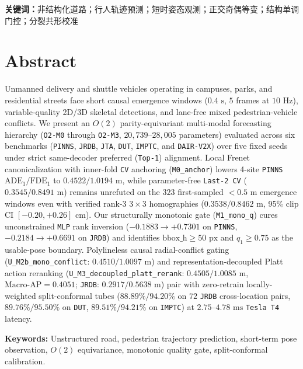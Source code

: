 \documentclass[UTF8,a4paper,12pt,openany,oneside]{ctexrep}
\begin{document}
\medskip\noindent\textbf{关键词：}非结构化道路；行人轨迹预测；短时姿态观测；正交奇偶等变；结构单调门控；分裂共形校准

\chapter*{Abstract}
Unmanned delivery and shuttle vehicles operating in campuses, parks, and residential streets face short causal emergence windows ($0.4\text{ s}$, $5$ frames at $10\text{ Hz}$), variable-quality 2D/3D skeletal detections, and lane-free mixed pedestrian-vehicle conflicts. We present an $O(2)$ parity-equivariant multi-modal forecasting hierarchy (\texttt{O2-M0} through \texttt{O2-M3}, $20{,}739\text{--}28{,}005$ parameters) evaluated across six benchmarks (\texttt{PINNS}, \texttt{JRDB}, \texttt{JTA}, \texttt{DUT}, \texttt{IMPTC}, and \texttt{DAIR-V2X}) over five fixed seeds under strict same-decoder preferred (\texttt{Top-1}) alignment. Local Frenet canonicalization with inner-fold \texttt{CV} anchoring (\texttt{M0\_anchor}) lowers 4-site \texttt{PINNS} $\text{ADE}_1/\text{FDE}_1$ to $0.4522 / 1.0194\text{ m}$, while parameter-free \texttt{Last-2 CV} ($0.3545 / 0.8491\text{ m}$) remains unrefuted on the $323$ first-sampled $<0.5\text{ m}$ emergence windows even with verified rank-3 $3\times 3$ homographies ($0.3538 / 0.8462\text{ m}$, 95\% clip CI $[-0.20, +0.26]\text{ cm}$). Our structurally monotonic gate (\texttt{M1\_mono\_q}) cures unconstrained \texttt{MLP} rank inversion ($-0.1883 \to +0.7301$ on \texttt{PINNS}, $-0.2184 \to +0.6691$ on \texttt{JRDB}) and identifies $\text{bbox\_h} \ge 50\text{ px}$ and $q_1 \ge 0.75$ as the usable-pose boundary. Polylineless causal radial-conflict gating (\texttt{U\_M2b\_mono\_conflict}: $0.4510 / 1.0097\text{ m}$) and representation-decoupled Platt action reranking (\texttt{U\_M3\_decoupled\_platt\_rerank}: $0.4505 / 1.0085\text{ m}$, $\text{Macro-AP}=0.4051$; \texttt{JRDB}: $0.2917 / 0.5638\text{ m}$) pair with zero-retrain locally-weighted split-conformal tubes ($88.89\% / 94.20\%$ on $72$ \texttt{JRDB} cross-location pairs, $89.76\% / 95.50\%$ on \texttt{DUT}, $89.51\% / 94.21\%$ on \texttt{IMPTC}) at $2.75\text{--}4.78\text{ ms}$ \texttt{Tesla T4} latency.

\medskip\noindent\textbf{Keywords:} Unstructured road, pedestrian trajectory prediction, short-term pose observation, $O(2)$ equivariance, monotonic quality gate, split-conformal calibration.

\tableofcontents
\clearpage
{}
\end{document}
